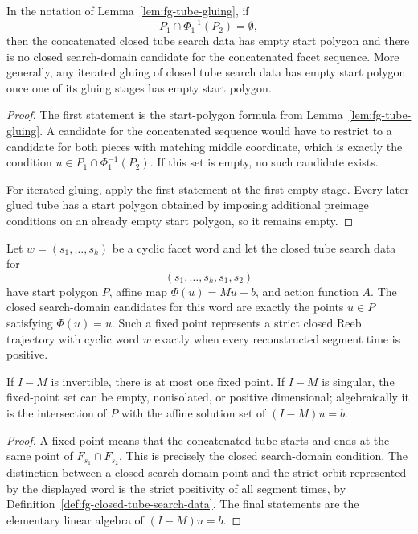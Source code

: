 \begin{unverified}
\begin{lemma}%
\label{lem:fg-empty-subtube-pruning}
In the notation of Lemma~\ref{lem:fg-tube-gluing}, if
\[
  P_1\cap\Phi_1^{-1}(P_2)=\emptyset,
\]
then the concatenated closed tube search data has empty start polygon and
there is no closed search-domain candidate for the concatenated facet
sequence.  More generally, any iterated gluing of closed tube search data has
empty start polygon once one of its gluing stages has empty start polygon.
\end{lemma}

\begin{proof}
The first statement is the start-polygon formula from
Lemma~\ref{lem:fg-tube-gluing}.  A candidate for the concatenated sequence
would have to restrict to a candidate for both pieces with matching middle
coordinate, which is exactly the condition
\(u\in P_1\cap\Phi_1^{-1}(P_2)\).  If this set is empty, no such candidate
exists.

For iterated gluing, apply the first statement at the first empty stage.  Every
later glued tube has a start polygon obtained by imposing additional preimage
conditions on an already empty start polygon, so it remains empty.
\end{proof}
\end{unverified}

\begin{unverified}
\begin{lemma}\label{lem:fg-closed-tube-fixed-points}
Let \(w=(s_1,\ldots,s_k)\) be a cyclic facet word and let the closed tube
search data for
\[
  (s_1,\ldots,s_k,s_1,s_2)
\]
have start polygon \(P\), affine map \(\Phi(u)=Mu+b\), and action function
\(A\).  The closed search-domain candidates for this word are exactly the
points \(u\in P\) satisfying \(\Phi(u)=u\).  Such a fixed point represents a
strict closed Reeb trajectory with cyclic word \(w\) exactly when every
reconstructed segment time is positive.

If \(I-M\) is invertible, there is at most one fixed point.  If \(I-M\) is
singular, the fixed-point set can be empty, nonisolated, or positive
dimensional; algebraically it is the intersection of \(P\) with the affine
solution set of \((I-M)u=b\).
\end{lemma}

\begin{proof}
A fixed point means that the concatenated tube starts and ends at the same
point of \(F_{s_1}\cap F_{s_2}\).  This is precisely the closed search-domain
condition.  The distinction between a closed search-domain point and the strict
orbit represented by the displayed word is the strict positivity of all segment
times, by Definition~\ref{def:fg-closed-tube-search-data}.  The final
statements are the elementary linear algebra of \((I-M)u=b\).
\end{proof}
\end{unverified}

